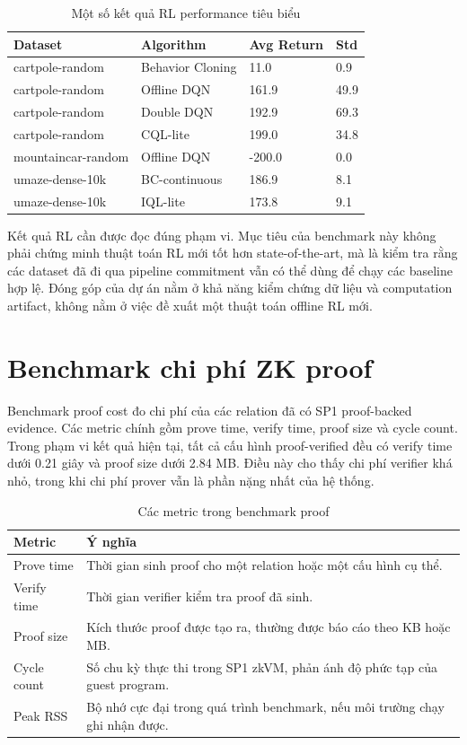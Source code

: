 \documentclass[12pt,a4paper,oneside]{report}
\begin{document}
\begin{table}[H]
\centering
\caption{Một số kết quả RL performance tiêu biểu}
\begin{tabularx}{\textwidth}{p{} p{} p{} p{}}
\toprule
Dataset & Algorithm & Avg Return & Std \\
\midrule
cartpole-random & Behavior Cloning & 11.0 & 0.9 \\
cartpole-random & Offline DQN & 161.9 & 49.9 \\
cartpole-random & Double DQN & 192.9 & 69.3 \\
cartpole-random & CQL-lite & 199.0 & 34.8 \\
mountaincar-random & Offline DQN & -200.0 & 0.0 \\
umaze-dense-10k & BC-continuous & 186.9 & 8.1 \\
umaze-dense-10k & IQL-lite & 173.8 & 9.1 \\
\bottomrule
\end{tabularx}
\end{table}

Kết quả RL cần được đọc đúng phạm vi. Mục tiêu của benchmark này không phải chứng minh thuật toán RL mới tốt hơn state-of-the-art, mà là kiểm tra rằng các dataset đã đi qua pipeline commitment vẫn có thể dùng để chạy các baseline hợp lệ. Đóng góp của dự án nằm ở khả năng kiểm chứng dữ liệu và computation artifact, không nằm ở việc đề xuất một thuật toán offline RL mới.

\section{Benchmark chi phí ZK proof}

Benchmark proof cost đo chi phí của các relation đã có SP1 proof-backed evidence. Các metric chính gồm prove time, verify time, proof size và cycle count. Trong phạm vi kết quả hiện tại, tất cả cấu hình proof-verified đều có verify time dưới 0.21 giây và proof size dưới 2.84 MB. Điều này cho thấy chi phí verifier khá nhỏ, trong khi chi phí prover vẫn là phần nặng nhất của hệ thống.

\begin{table}[H]
\centering
\caption{Các metric trong benchmark proof}
\begin{tabularx}{\textwidth}{p{} p{}}
\toprule
Metric & Ý nghĩa \\
\midrule
Prove time & Thời gian sinh proof cho một relation hoặc một cấu hình cụ thể. \\
Verify time & Thời gian verifier kiểm tra proof đã sinh. \\
Proof size & Kích thước proof được tạo ra, thường được báo cáo theo KB hoặc MB. \\
Cycle count & Số chu kỳ thực thi trong SP1 zkVM, phản ánh độ phức tạp của guest program. \\
Peak RSS & Bộ nhớ cực đại trong quá trình benchmark, nếu môi trường chạy ghi nhận được. \\
\bottomrule
\end{tabularx}
\end{table}
\end{document}
